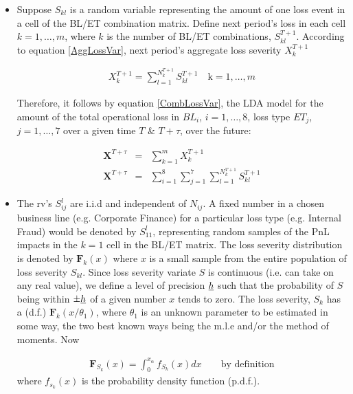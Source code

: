 \documentclass{DissertateUSU}
\begin{document}
\begin{itemize}
\item Suppose $S_{kl}$ is a random variable representing the amount of one loss event in a cell of the BL/ET combination matrix. Define next period's loss in each cell $k = 1, \ldots, m$, where $k$ is the number of BL/ET combinations, $S_{kl}^{T+1}$. According to equation \ref{AggLossVar}, next period's aggregate loss severity $X_{k}^{T+1}$   

\singlespacing
\begin{eqnarray}\label{AggNexLossVar}
{X}_k^{T+1} = \sum_{l=1}^{N_k^{T+1}}S_{kl}^{T+1} \quad \mbox{k} = 1,\ldots,m
\end{eqnarray}
\doublespacing

Therefore, it follows by equation \ref{CombLossVar}, the LDA model for the amount of the total operational loss in $BL_i$, $i = 1,\ldots,8$, loss type $ET_j$, $j=1,\ldots,7$ over a given time $T$ \& $T + \tau$, over the future:

\singlespacing
\begin{eqnarray}\label{NexLossVar}
\mathbf{X}^{T+\tau} &=& \sum_{k=1}^{m}{X}_k^{T+1} \nonumber\\
\mathbf{X}^{T+\tau} &=& \sum_{i=1}^{8}\sum_{j=1}^{7}\sum_{l=1}^{N_k^{T+1}}S_{kl}^{T+1} 
\end{eqnarray}
\doublespacing

\item The rv's $S_{ij}^l$ are i.i.d and independent of $N_{ij}$. A fixed number in a chosen business line (e.g. Corporate Finance) for a particular loss type (e.g. Internal Fraud) would be denoted by $S_{11}^l$, representing random samples of the PnL impacts in the $k=1$ cell in the BL/ET matrix. The loss severity distribution is denoted by $\mathbf{F}_k(x)$ where $x$ is a small sample from the entire population of loss severity $S_{kl}$. Since loss severity variate $S$ is continuous (i.e. can take on any real value), we define a level of precision $\emph{h}$ such that the probability of $S$ being within $\pm\emph{h}$ of a given number $x$ tends to zero. The loss severity, $S_k$ has a (d.f.) $\mathbf{F}_{k}(x/\theta_1) $, where $\theta_1$ is an unknown parameter to be estimated in some way, the two best known ways being the m.l.e and/or the method of moments. Now

\singlespacing
\begin{eqnarray}\label{SeveritydistributionFcn}
\mathbf{F}_{S_{k}}(x) = \int_{0}^{x_\alpha} f_{S_{k}}(x)dx \qquad \mbox{by definition}
\end{eqnarray}
\doublespacing
where $f_{s_{k}}(x)$ is the probability density function (p.d.f.).


\end{itemize}
\end{document}
